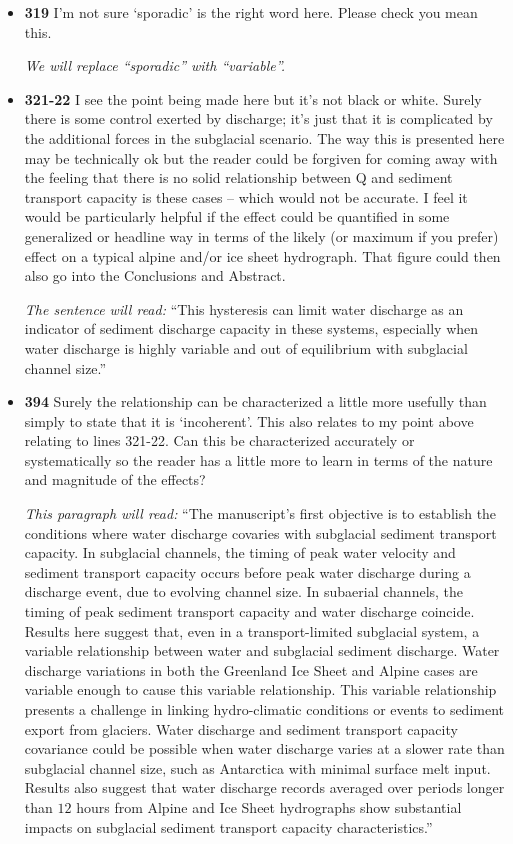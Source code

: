 \documentclass[11pt]{article}
\begin{document}
\begin{itemize}
\item \textbf{319} I’m not sure ‘sporadic’ is the right word here. Please check you mean this.

  \textit{We will replace ``sporadic'' with ``variable''.}
  

  
\item \textbf{321-22} I see the point being made here but it’s not black or white. Surely there is
  some control exerted by discharge; it’s just that it is complicated by the
  additional forces in the subglacial scenario. The way this is presented here
  may be technically ok but the reader could be forgiven for coming away
  with the feeling that there is no solid relationship between Q and sediment
  transport capacity is these cases – which would not be accurate. I feel it
  would be particularly helpful if the effect could be quantified in some
  generalized or headline way in terms of the likely (or maximum if you
  prefer) effect on a typical alpine and/or ice sheet hydrograph. That figure
  could then also go into the Conclusions and Abstract.

  \textit{The sentence will read:} ``This hysteresis can limit water discharge as an indicator of sediment discharge capacity in these systems, especially when water discharge is highly variable and out of equilibrium with subglacial channel size.''

\item \textbf{394} Surely the relationship can be characterized a little more usefully than
  simply to state that it is ‘incoherent’. This also relates to my point above
  relating to lines 321-22. Can this be characterized accurately or
  systematically so the reader has a little more to learn in terms of the nature
  and magnitude of the effects?

\textit{This paragraph will read:} ``The manuscript's first objective is to establish the conditions where water discharge covaries with subglacial sediment transport capacity.
In subglacial channels, the timing of peak water velocity and sediment transport capacity occurs before peak water discharge during a discharge event, due to evolving channel size.
In subaerial channels, the timing of peak sediment transport capacity and water discharge coincide.
Results here suggest that, even in a transport-limited subglacial system, a variable relationship between water and subglacial sediment discharge.
Water discharge variations in both the Greenland Ice Sheet and Alpine cases are variable enough to cause this variable relationship.
This variable relationship presents a challenge in linking hydro-climatic conditions or events to sediment export from glaciers.
Water discharge and sediment transport capacity covariance could be possible when water discharge varies at a slower rate than subglacial channel size, such as Antarctica with minimal surface melt input.
Results also suggest that water discharge records averaged over periods longer than $12$ hours from Alpine and Ice Sheet hydrographs show substantial impacts on subglacial sediment transport capacity characteristics.''


\end{itemize}
\end{document}
